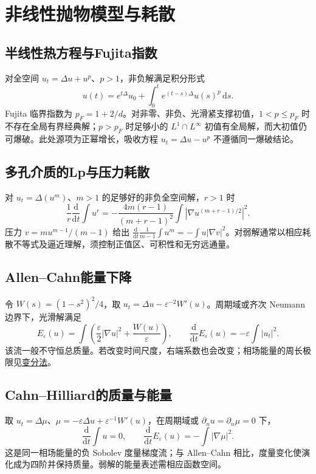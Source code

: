 \documentclass[../main.tex]{subfiles}
\begin{document}
\section{非线性抛物模型与耗散}
\subsection{半线性热方程与Fujita指数}
对全空间 $u_t=\Delta u+u^p$、$p>1$，非负解满足积分形式
\[
u(t)=e^{t\Delta}u_0+\int_0^te^{(t-s)\Delta}u(s)^p\,\mathrm ds.
\]
Fujita 临界指数为 $p_F=1+2/d$。对非零、非负、光滑紧支撑初值，$1<p\le p_F$ 时不存在全局有界经典解；$p>p_F$ 时足够小的 $L^1\cap L^\infty$ 初值有全局解，而大初值仍可爆破。此处源项为正幂增长，吸收方程 $u_t=\Delta u-u^p$ 不遵循同一爆破结论。
\subsection{多孔介质的Lp与压力耗散}
对 $u_t=\Delta(u^m)$、$m>1$ 的足够好的非负全空间解，$r>1$ 时
\[
\frac1r\frac{\mathrm d}{\mathrm dt}\int u^r
=-\frac{4m(r-1)}{(m+r-1)^2}\int\left|\nabla u^{(m+r-1)/2}\right|^2.
\]
压力 $v=mu^{m-1}/(m-1)$ 给出 $\frac{\mathrm d}{\mathrm dt}\frac1{m-1}\int u^m=-\int u|\nabla v|^2$。对弱解通常以相应耗散不等式及逼近理解，须控制正值区、可积性和无穷远通量。
\subsection{Allen--Cahn能量下降}
令 $W(s)=(1-s^2)^2/4$，取 $u_t=\Delta u-\varepsilon^{-2}W'(u)$。周期域或齐次 Neumann 边界下，光滑解满足
\[
E_\varepsilon(u)=\int\left(\frac\varepsilon2|\nabla u|^2+\frac{W(u)}\varepsilon\right),\qquad
\frac{\mathrm d}{\mathrm dt}E_\varepsilon(u)=-\varepsilon\int|u_t|^2.
\]
该流一般不守恒总质量。若改变时间尺度，右端系数也会改变；相场能量的周长极限见\hyperref[chap:calculus-of-variations]{变分法}。
\subsection{Cahn--Hilliard的质量与能量}
取 $u_t=\Delta\mu$、$\mu=-\varepsilon\Delta u+\varepsilon^{-1}W'(u)$，在周期域或 $\partial_nu=\partial_n\mu=0$ 下，
\[
\frac{\mathrm d}{\mathrm dt}\int u=0,\qquad
\frac{\mathrm d}{\mathrm dt}E_\varepsilon(u)=-\int|\nabla\mu|^2.
\]
这是同一相场能量的负 Sobolev 度量梯度流；与 Allen--Cahn 相比，度量变化使演化成为四阶并保持质量。弱解的能量表述需相应函数空间。
\end{document}
